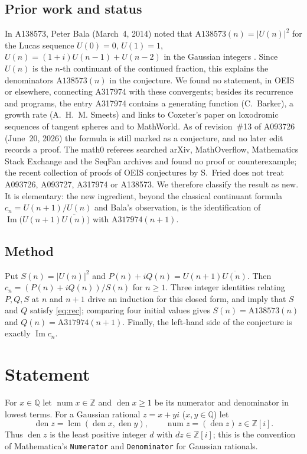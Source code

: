 \documentclass[11pt]{amsart}
\theoremstyle{plain}
\theoremstyle{definition}
\newcommand{\Z}{\mathbb{Z}}
\newcommand{\Q}{\mathbb{Q}}
\newcommand{\cj}[1]{\overline{#1}}
\newcommand{\seq}[1]{\mathrm{A#1}}
\DeclareMathOperator{\im}{Im}
\DeclareMathOperator{\den}{den}
\DeclareMathOperator{\num}{num}
\begin{document}
\subsection*{Prior work and status}
In A138573, Peter Bala (March~4, 2014) noted that $\seq{138573}(n)=|U(n)|^2$ for the Lucas sequence $U(0)=0$, $U(1)=1$, $U(n)=(1+i)U(n-1)+U(n-2)$ in the Gaussian integers \cite{A138573}. Since $U(n)$ is the $n$-th continuant of the continued fraction, this explains the denominators $\seq{138573}(n)$ in the conjecture. We found no statement, in OEIS or elsewhere, connecting A317974 with these convergents; besides its recurrence and programs, the entry A317974 contains a generating function (C.~Barker), a growth rate (A.~H.~M. Smeets) and links to Coxeter's paper on loxodromic sequences of tangent spheres \cite{Cox} and to MathWorld. As of revision~\#13 of A093726 (June~20, 2026) the formula is still marked as a conjecture, and no later edit records a proof. The math0 referees searched arXiv, MathOverflow, Mathematics Stack Exchange and the SeqFan archives and found no proof or counterexample; the recent collection of proofs of OEIS conjectures by S.~Fried \cite{Fried} does not treat A093726, A093727, A317974 or A138573. We therefore classify the result as new. It is elementary: the new ingredient, beyond the classical continuant formula $c_n=U(n+1)/U(n)$ and Bala's observation, is the identification of $\im\bigl(U(n+1)\cj{U(n)}\bigr)$ with $\seq{317974}(n+1)$.

\subsection*{Method}
Put $S(n)=|U(n)|^2$ and $P(n)+iQ(n)=U(n+1)\cj{U(n)}$. Then $c_n=(P(n)+iQ(n))/S(n)$ for $n\ge1$. Three integer identities relating $P,Q,S$ at $n$ and $n+1$ drive an induction for this closed form, and imply that $S$ and $Q$ satisfy \eqref{eq:rec}; comparing four initial values gives $S(n)=\seq{138573}(n)$ and $Q(n)=\seq{317974}(n+1)$. Finally, the left-hand side of the conjecture is exactly $\im c_n$.

\section{Statement}\label{sec:statement}

For $x\in\Q$ let $\num x\in\Z$ and $\den x\ge1$ be its numerator and denominator in lowest terms. For a Gaussian rational $z=x+yi$ ($x,y\in\Q$) let
\[
\den z=\operatorname{lcm}(\den x,\den y),\qquad \num z=(\den z)\,z\in\Z[i].
\]
Thus $\den z$ is the least positive integer $d$ with $dz\in\Z[i]$; this is the convention of Mathematica's \texttt{Numerator} and \texttt{Denominator} for Gaussian rationals.
\end{document}
